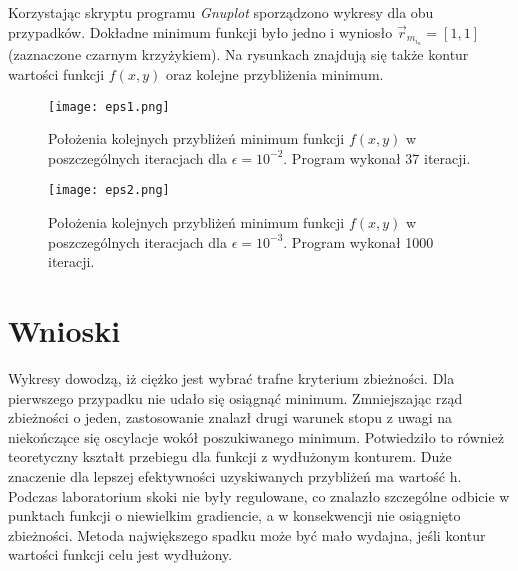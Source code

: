 \documentclass{article}
\begin{document}
Korzystając skryptu programu \textit{Gnuplot} sporządzono wykresy dla obu przypadków. Dokładne minimum funkcji było jedno i wyniosło $\vec{r}_m_i_n=[1,1]$ (zaznaczone czarnym krzyżykiem). Na rysunkach znajdują się także kontur wartości funkcji $ f(x, y) $ oraz kolejne przybliżenia minimum.
\begin{figure}[h!]
	\begin{center}
		\texttt{[image: eps1.png]}
	\caption{Położenia kolejnych przybliżeń minimum funkcji $ f(x, y) $ w poszczególnych iteracjach dla $\epsilon = 10^{-2} $. Program wykonał 37 iteracji.}
	\label{pierwszy} 
	\end{center}
\end{figure}
\begin{figure}[h!]
	\begin{center}
	\texttt{[image: eps2.png]}
	\caption{Położenia kolejnych przybliżeń minimum funkcji $ f(x, y) $ w poszczególnych iteracjach dla $\epsilon = 10^{-3} $. Program wykonał 1000 iteracji.}
	\label{drugi} 
\end{center}
\end{figure}

\newpage
\section{Wnioski}

Wykresy dowodzą, iż ciężko jest wybrać trafne kryterium zbieżności. Dla pierwszego przypadku nie udało się osiągnąć minimum. Zmniejszając rząd zbieżności o jeden, zastosowanie znalazł drugi warunek stopu z uwagi na niekończące się oscylacje wokół poszukiwanego minimum. Potwiedziło to również teoretyczny kształt przebiegu dla funkcji z wydłużonym konturem. Duże znaczenie dla lepszej efektywności uzyskiwanych przybliżeń ma wartość h. Podczas laboratorium skoki nie były regulowane, co znalazło szczególne odbicie w punktach funkcji o niewielkim gradiencie, a w konsekwencji nie osiągnięto zbieżności. Metoda największego spadku może być mało wydajna, jeśli kontur wartości funkcji celu jest wydłużony.
\end{document}
